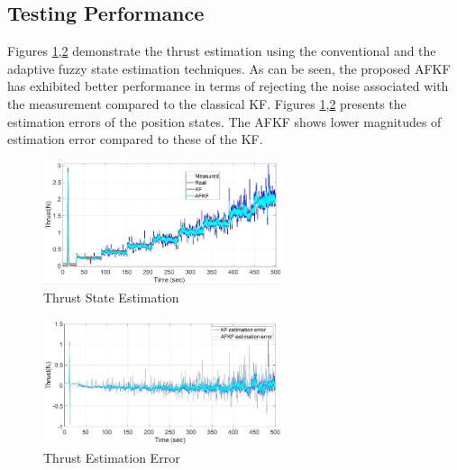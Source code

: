 \documentclass[conference]{IEEEtran}
\begin{document}
\subsection{Testing Performance}
Figures \ref{akf1},\ref{akf2} demonstrate the thrust estimation using the conventional and the adaptive fuzzy state estimation techniques. As can be seen, the proposed AFKF has exhibited better performance in terms of rejecting the noise associated with the measurement compared to the classical KF. Figures \ref{akf1},\ref{akf2} presents the estimation errors of the position states. The AFKF shows lower magnitudes of estimation error compared to these of the KF. 
\begin{figure}[htbp]
	\includegraphics[width=7cm]{images/akf1.jpg}
	\caption{Thrust State Estimation}
	\label{akf1}
\end{figure}
\begin{figure}[htbp]
	\includegraphics[width=7cm]{images/akf2.jpg}
	\caption{Thrust Estimation Error}
	\label{akf2}
\end{figure}
\end{document}
